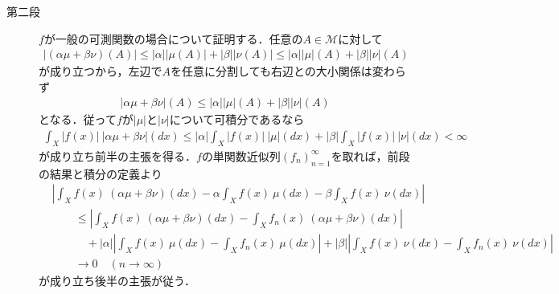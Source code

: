 \begin{prf}
\begin{description}
			\item[第二段]
			$f$が一般の可測関数の場合について証明する．任意の$A \in \mathcal{M}$に対して
			\begin{align}
				\left| (\alpha \mu + \beta \nu)(A) \right| \leq |\alpha||\mu(A)| + |\beta||\nu(A)| \leq |\alpha||\mu|(A) + |\beta||\nu|(A)
 			\end{align}
 			が成り立つから，左辺で$A$を任意に分割しても右辺との大小関係は変わらず
 			\begin{align}
 				|\alpha \mu + \beta \nu|(A) \leq |\alpha||\mu|(A) + |\beta||\nu|(A)
 			\end{align}
 			となる．従って$f$が$|\mu|$と$|\nu|$について可積分であるなら
 			\begin{align}
 				\int_X |f(x)|\ |\alpha \mu + \beta \nu|(dx) \leq |\alpha| \int_X |f(x)|\ |\mu|(dx) + |\beta| \int_X |f(x)|\ |\nu|(dx) < \infty
 			\end{align}
 			が成り立ち前半の主張を得る．$f$の単関数近似列$(f_n)_{n=1}^{\infty}$を取れば，前段の結果と積分の定義より
 			\begin{align}
 				&\left| \int_X f(x)\ (\alpha\mu + \beta\nu)(dx) - \alpha \int_X f(x)\ \mu(dx) - \beta \int_X f(x)\ \nu(dx) \right| \\
 					&\qquad \leq \left| \int_X f(x)\ (\alpha\mu + \beta\nu)(dx) - \int_X f_n(x)\ (\alpha\mu + \beta\nu)(dx) \right| \\
 					&\qquad \quad + |\alpha| \left| \int_X f(x)\ \mu(dx) - \int_X f_n(x)\ \mu(dx) \right|
 					+ |\beta| \left| \int_X f(x)\ \nu(dx) - \int_X f_n(x)\ \nu(dx) \right| \\
 				&\qquad \longrightarrow 0 \quad (n \longrightarrow \infty)
 			\end{align}
 			が成り立ち後半の主張が従う．
 			\QED
		\end{description}
	\end{prf}